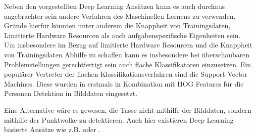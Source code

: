 Neben den vorgestellten Deep Learning Ansätzen kann es auch durchaus angebrachter sein andere Verfahren des Maschinellen Lernens zu verwenden. Gründe hierfür könnten unter anderem die Knappheit von Trainingsdaten, Limitierte Hardware Resourcen als auch aufgabenspezifische Eigenheiten sein. Um insbesondere im Bezug auf limitierte Hardware Resourcen und die Knappheit von Trainingsdaten Abhilfe zu schaffen kann es insbesondere bei überschaubaren Problemstellungen gerechtfertigt sein auch flache Klassifikatoren einzusetzen. Ein populärer Vertreter der flachen Klassifikationsverfahren sind die Support Vector Machines. Diese wurden in \cite{Dalal.2005} erstmals in Kombination mit HOG Features für die Personen Detektion in Bilddaten eingesetzt.

Eine Alternative wäre es gewesen, die Tasse nicht mithilfe der Bilddaten, sondern mithilfe der Punktwolke zu detektieren. Auch hier existieren Deep Learning basierte Ansätze wie z.B. \cite{Maturana.2015} oder \cite{Engelcke.20170305}.